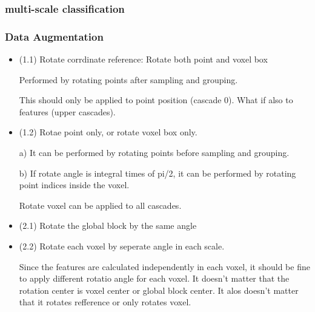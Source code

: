 \documentclass{article}
\begin{document}
\subsubsection{multi-scale classification}



\subsubsection{Data Augmentation} 
\begin{itemize}
\item (1.1) Rotate corrdinate reference: Rotate both point and voxel box \par
Performed by rotating points after sampling and grouping. \par
This should only be applied to point position (cascade 0). What if also to features (upper cascades).

\item (1.2) Rotae point only, or rotate voxel box only. \par
a) It can be performed by rotating points before sampling and grouping.\par
b) If rotate angle is integral times of pi/2, it can be performed by rotating point indices inside the voxel.\par
Rotate voxel can be applied to all cascades.
\item (2.1) Rotate the global block by the same angle
\item (2.2) Rotate each voxel by seperate angle in each scale.\par
Since the features are calculated independently in each voxel, it should be fine to apply different rotatio angle for each voxel. It doesn't matter that the rotation center is voxel center or global block center. It alos doesn't matter that it rotates refference or only rotates voxel.

\end{itemize}
\end{document}

